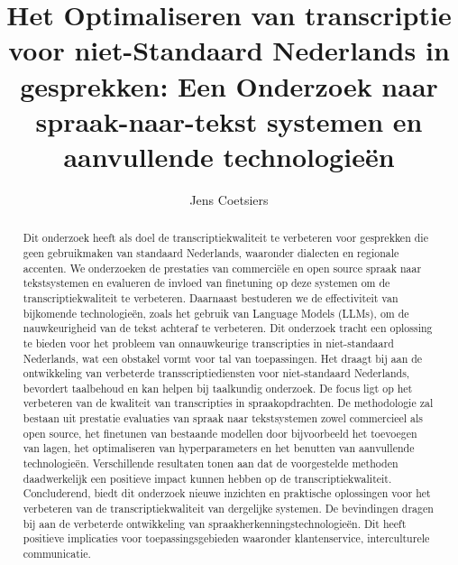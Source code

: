 \documentclass{hogent-article}
\title{Het Optimaliseren van transcriptie voor niet-Standaard Nederlands in gesprekken: Een Onderzoek naar spraak-naar-tekst systemen en aanvullende technologieën}
\author{Jens Coetsiers}
\begin{document}
\begin{abstract}
Dit onderzoek heeft als doel de transcriptiekwaliteit te verbeteren voor gesprekken die geen gebruikmaken van standaard Nederlands, waaronder dialecten en regionale accenten. We onderzoeken de prestaties van commerciële en open source spraak naar tekstsystemen en evalueren de invloed van finetuning op deze systemen om de transcriptiekwaliteit te verbeteren. Daarnaast bestuderen we de effectiviteit van bijkomende technologieën, zoals het gebruik van Language Models (LLMs), om de nauwkeurigheid van de tekst achteraf te verbeteren. Dit onderzoek tracht een oplossing te bieden voor het probleem van onnauwkeurige transcripties in niet-standaard Nederlands, wat een obstakel vormt voor tal van toepassingen. Het draagt bij aan de ontwikkeling van verbeterde transscriptiediensten voor niet-standaard Nederlands, bevordert taalbehoud en kan helpen bij taalkundig onderzoek. De focus ligt op het verbeteren van de kwaliteit van transcripties in spraakopdrachten.
De methodologie zal bestaan uit prestatie evaluaties van spraak naar tekstsystemen zowel commercieel als open source, het finetunen van bestaande modellen door bijvoorbeeld het toevoegen van lagen, het optimaliseren van hyperparameters en het benutten van aanvullende technologieën.
Verschillende resultaten tonen aan dat de voorgestelde methoden daadwerkelijk een positieve impact kunnen hebben op de transcriptiekwaliteit.
Concluderend, biedt dit onderzoek nieuwe inzichten en praktische oplossingen voor het verbeteren van de transcriptiekwaliteit van dergelijke systemen. De bevindingen dragen bij aan de verbeterde ontwikkeling van spraakherkenningstechnologieën. Dit heeft positieve implicaties voor toepassingsgebieden waaronder klantenservice, interculturele communicatie.
\end{abstract}

\tableofcontents



\printbibliography[heading=bibintoc]
\end{document}
